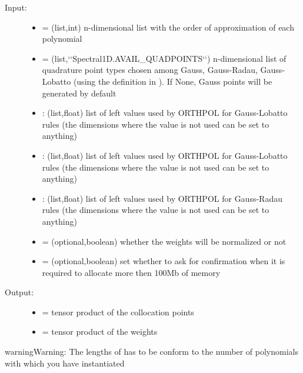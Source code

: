 \documentclass[letterpaper,10pt,english]{sphinxmanual}
\begin{document}
\begin{fulllineitems}
\begin{fulllineitems}
\begin{description}
\item[{Input:}] \leavevmode\begin{itemize}
\item {} 
 = (list,int) n-dimensional list with the order of approximation of each polynomial

\item {} 
 = (list,{}`{}`Spectral1D.AVAIL\_QUADPOINTS{}`{}`) n-dimensional list of quadrature point types chosen among Gauss, Gauss-Radau, Gauss-Lobatto (using the definition in ). If None, Gauss points will be generated by default

\item {} 
: (list,float) list of left values used by ORTHPOL for Gauss-Lobatto rules (the dimensions where the value is not used can be set to anything)

\item {} 
: (list,float) list of left values used by ORTHPOL for Gauss-Lobatto rules (the dimensions where the value is not used can be set to anything)

\item {} 
: (list,float) list of left values used by ORTHPOL for Gauss-Radau rules (the dimensions where the value is not used can be set to anything)

\item {} 
 = (optional,boolean) whether the weights will be normalized or not

\item {} 
 = (optional,boolean) set whether to ask for confirmation when it is required to allocate more then 100Mb of memory

\end{itemize}

\item[{Output:}] \leavevmode\begin{itemize}
\item {} 
 = tensor product of the collocation points

\item {} 
 = tensor product of the weights

\end{itemize}

\end{description}

\begin{notice}{warning}{Warning:}
The lengths of  has to be conform to the number of polynomials with which you have instantiated 
\end{notice}

\end{fulllineitems}


\end{fulllineitems}
\end{document}

